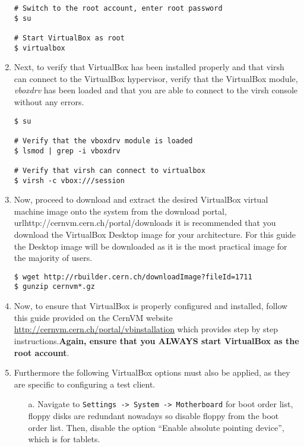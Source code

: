 \begin{enumerate}
\lstset{language=bash,caption=Always Start VirtualBox as Root}
\begin{lstlisting}
# Switch to the root account, enter root password
$ su

# Start VirtualBox as root
$ virtualbox
\end{lstlisting}

\item	Next, to verify that VirtualBox has been installed properly and that virsh can connect to the VirtualBox hypervisor, 
		verify that the VirtualBox module, \emph{vboxdrv} has been loaded and that you are able to connect to the virsh console 
		without any errors.

\lstset{language=bash,caption=Verify that virsh can Access VirtualBox}
\begin{lstlisting}
$ su

# Verify that the vboxdrv module is loaded
$ lsmod | grep -i vboxdrv

# Verify that virsh can connect to virtualbox
$ virsh -c vbox:///session
\end{lstlisting}

\item	Now, proceed to download and extract the desired VirtualBox virtual machine image onto the system from the \cernvm download 
		portal, url{http://cernvm.cern.ch/portal/downloads} it is recommended that you download the VirtualBox Desktop image for your 
		architecture. For this guide the Desktop image will be downloaded as it is the most practical image for the majority of 
		users.
		
\lstset{language=bash,caption=Download and Extract CernVM VirtualBox Desktop Image}
\begin{lstlisting}
$ wget http://rbuilder.cern.ch/downloadImage?fileId=1711
$ gunzip cernvm*.gz
\end{lstlisting}

\item 	Now, to ensure that VirtualBox is properly configured and installed, follow this guide provided on the CernVM website
		\url{http://cernvm.cern.ch/portal/vbinstallation} which provides step by step instructions.{\bf Again, ensure that you 
		ALWAYS start VirtualBox as the root account}.

\item	Furthermore the following VirtualBox options must also be applied, as they are specific to configuring a \cernvm test client.
\begin{itemize}
\item[a.]	Navigate to \verb|Settings -> System -> Motherboard| for boot order list, floppy disks are redundant nowadays so disable 
			floppy from the boot order list. Then, disable the option ``Enable absolute pointing device'', which is for tablets.
			

\end{itemize}
\end{enumerate}
